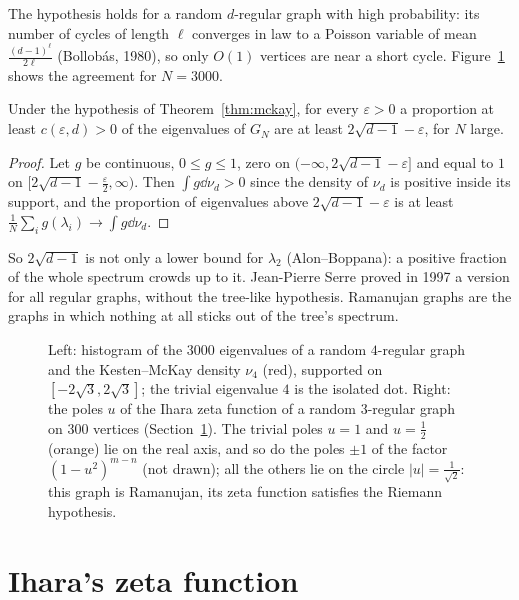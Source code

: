 The hypothesis holds for a random $d$-regular graph with high probability: its number of cycles of length $\ell$ converges in law to a Poisson variable of mean $\frac{(d-1)^\ell}{2\ell}$ (Bollob\'as, 1980), so only $O(1)$ vertices
are near a short cycle. Figure~\ref{fig:kestenmckay} shows the agreement for $N=3000$.

\begin{corollary}\label{cor:serre}
Under the hypothesis of Theorem~\ref{thm:mckay}, for every $\varepsilon>0$ a proportion at least $c(\varepsilon,d)>0$ of the eigenvalues of $G_N$ are at least $2\sqrt{d-1}-\varepsilon$, for $N$ large.
\end{corollary}

\begin{proof}
Let $g$ be continuous, $0\le g\le1$, zero on $(-\infty,2\sqrt{d-1}-\varepsilon]$ and equal to $1$ on $[2\sqrt{d-1}-\frac\varepsilon2,\infty)$. Then $\int g\dd\nu_d>0$ since the density of $\nu_d$ is positive inside its support, and the
proportion of eigenvalues above $2\sqrt{d-1}-\varepsilon$ is at least $\frac1N\sum_ig(\lambda_i)\to\int g\dd\nu_d$.
\end{proof}

So $2\sqrt{d-1}$ is not only a lower bound for $\lambda_2$ (Alon--Boppana): a positive fraction of the whole spectrum crowds up to it. Jean-Pierre Serre proved in 1997 a version for all regular graphs, without the
tree-like hypothesis. Ramanujan graphs are the graphs in which nothing at all sticks out of the tree's spectrum.

\begin{figure}[ht]
\centering
{}
\caption{Left: histogram of the $3000$ eigenvalues of a random $4$-regular graph and the Kesten--McKay density $\nu_4$ (red), supported on $[-2\sqrt3,2\sqrt3]$; the trivial eigenvalue $4$ is the isolated dot. Right: the
poles $u$ of the Ihara zeta function of a random $3$-regular graph on $300$ vertices (Section~\ref{sec:ihara}). The trivial poles $u=1$ and $u=\frac12$ (orange) lie on the real axis, and so do the poles $\pm1$ of the factor $(1-u^2)^{m-n}$ (not drawn); all the others lie on the circle
$|u|=\frac1{\sqrt2}$: this graph is Ramanujan, its zeta function satisfies the Riemann hypothesis.}
\label{fig:kestenmckay}
\end{figure}

\section{Ihara's zeta function}\label{sec:ihara}

